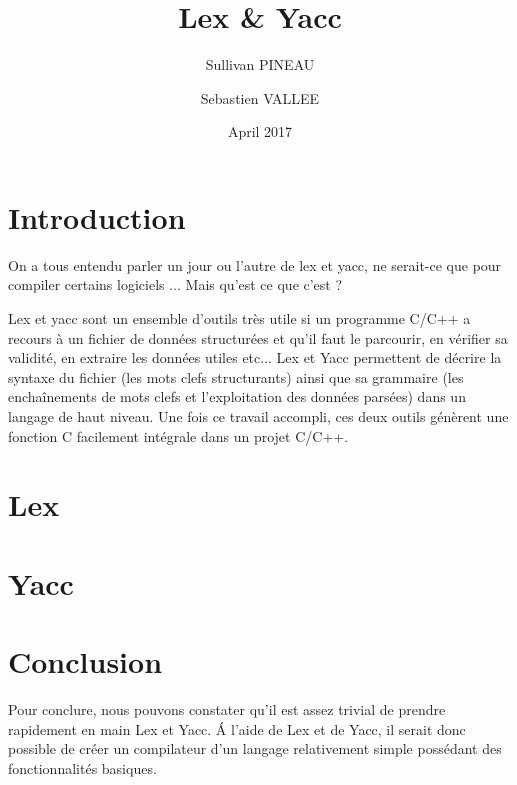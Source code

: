 \documentclass{article}
\title{Lex \& Yacc}
\author{Sullivan PINEAU \and Sebastien VALLEE }
\date{April 2017}
\begin{document}
\maketitle

\section{Introduction}
    On a tous entendu parler un jour ou l'autre de lex et yacc, ne serait-ce que pour compiler certains logiciels ... Mais qu'est ce que c'est ?
    
    Lex et yacc sont un ensemble d'outils très utile si un programme C/C++ a recours à un fichier de données structurées et qu'il faut le parcourir, en vérifier sa validité, en extraire les données utiles etc... Lex et Yacc permettent de décrire la syntaxe du fichier (les mots clefs structurants) ainsi que sa grammaire (les enchaînements de mots clefs et l'exploitation des données parsées) dans un langage de haut niveau. Une fois ce travail accompli, ces deux outils génèrent une fonction C facilement intégrale dans un projet C/C++. 
    
\section{Lex}
    

\section{Yacc}
    

\section{Conclusion}
Pour conclure, nous pouvons constater qu'il est assez trivial de prendre rapidement en main Lex et Yacc.
\newline
\'A l'aide de Lex et de Yacc, il serait donc possible de créer un compilateur d’un langage relativement simple possédant des fonctionnalités basiques.
\end{document}
